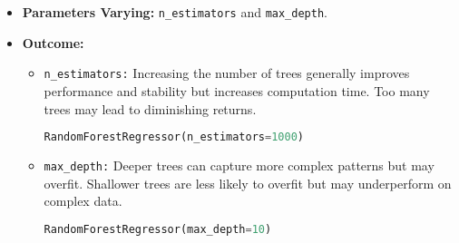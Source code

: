 \begin{itemize}
    \item \textbf{Parameters Varying:} \texttt{n\_estimators} and \texttt{max\_depth}.
    \item \textbf{Outcome:}
    \begin{itemize}
        \item \texttt{n\_estimators:} Increasing the number of trees generally improves performance and stability but increases computation time. Too many trees may lead to diminishing returns.
        \begin{lstlisting}[language=Python, caption=Increasing Value of \texttt{n\_estimators}]
RandomForestRegressor(n_estimators=1000)
		\end{lstlisting}
        \item \texttt{max\_depth:} Deeper trees can capture more complex patterns but may overfit. Shallower trees are less likely to overfit but may underperform on complex data.
        \begin{lstlisting}[language=Python, caption=Increasing Value of \texttt{n\_max\_depth}]
RandomForestRegressor(max_depth=10)
		\end{lstlisting}
    \end{itemize}
\end{itemize}

\clearpage